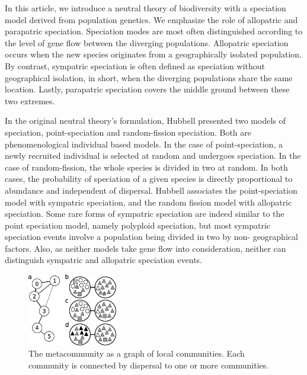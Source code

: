\documentclass[letterpaper,twocolumn,showkeys]{revtex4-1}
\begin{document}
In this article, we introduce a neutral theory of biodiversity with a
speciation model derived from population genetics. We emphasize the role of
allopatric and parapatric speciation. Speciation modes are most often
distinguished according to the level of gene flow between the diverging
populations. Allopatric speciation occurs when the new species originates from
a geographically isolated population. By contrast, sympatric speciation is
often defined as speciation without geographical isolation, in short, when the
diverging populations share the same location. Lastly, parapatric speciation
covers the middle ground between these two extremes.

In the original neutral theory's formulation, Hubbell presented two models of
speciation, point-speciation and random-fission speciation. Both are
phenomenological individual based models. In the case of point-speciation, a
newly recruited individual is selected at random and undergoes speciation. In
the case of random-fission, the whole species is divided in two at random. In
both cases, the probability of speciation of a given species is directly
proportional to abundance and independent of dispersal. Hubbell associates the
point-speciation model with sympatric speciation, and the random fission model
with allopatric speciation. Some rare forms of sympatric speciation are indeed
similar to the point speciation model, namely polyploid speciation, but most
sympatric speciation events involve a population being divided in two by non-
geographical factors. Also, as neither models take gene flow into
consideration, neither can distinguish sympatric and allopatric speciation
events.


\begin{figure}
\includegraphics[width=0.35\textwidth]{fig.eps}
\caption{The metacommunity as a graph of local communities. Each community is
connected by dispersal to one or more communities.}
\vspace{-1em}  
\end{figure}
\end{document}
